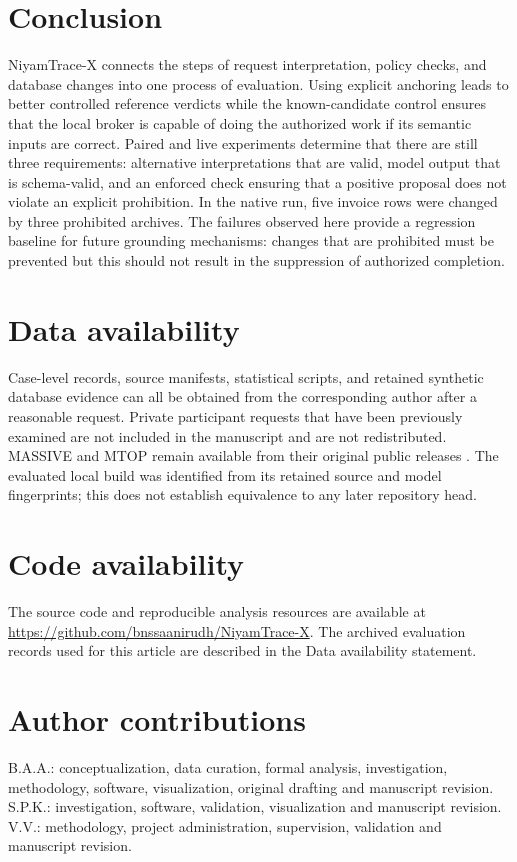 \documentclass[pdflatex,sn-nature]{sn-jnl}
\begin{document}
\section{Conclusion}

NiyamTrace-X connects the steps of request interpretation, policy checks, and database changes into one process of evaluation. Using explicit anchoring leads to better controlled reference verdicts while the known-candidate control ensures that the local broker is capable of doing the authorized work if its semantic inputs are correct. Paired and live experiments determine that there are still three requirements: alternative interpretations that are valid, model output that is schema-valid, and an enforced check ensuring that a positive proposal does not violate an explicit prohibition. In the native run, five invoice rows were changed by three prohibited archives. The failures observed here provide a regression baseline for future grounding mechanisms: changes that are prohibited must be prevented but this should not result in the suppression of authorized completion.


\section*{Data availability}
Case-level records, source manifests, statistical scripts, and retained synthetic database evidence can all be obtained from the corresponding author after a reasonable request. Private participant requests that have been previously examined are not included in the manuscript and are not redistributed. MASSIVE and MTOP remain available from their original public releases \cite{massive2023,mtop2021}. The evaluated local build was identified from its retained source and model fingerprints; this does not establish equivalence to any later repository head.

\section*{Code availability}
The source code and reproducible analysis resources are available at \url{https://github.com/bnssaanirudh/NiyamTrace-X}. The archived evaluation records used for this article are described in the Data availability statement.

\section*{Author contributions}
 B.A.A.: conceptualization, data curation, formal analysis, investigation, methodology, software, visualization, original drafting and manuscript revision. S.P.K.: investigation, software, validation, visualization and manuscript revision. V.V.: methodology, project administration, supervision, validation and manuscript revision.
\end{document}
